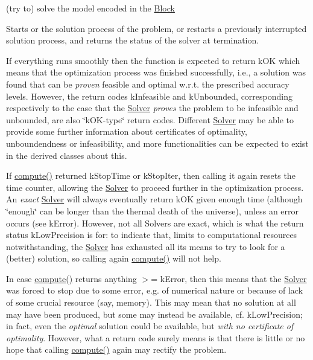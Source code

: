 (try to) solve the model encoded in the \mbox{\hyperlink{class_s_m_spp__di__unipi__it_1_1_block}{Block}} 

Starts or the solution process of the problem, or restarts a previously interrupted solution process, and returns the status of the solver at termination.

If everything runs smoothly then the function is expected to return k\+OK which means that the optimization process was finished successfully, i.\+e., a solution was found that can be {\itshape proven} feasible and optimal w.\+r.\+t. the prescribed accuracy levels. However, the return codes k\+Infeasible and k\+Unbounded, corresponding respectively to the case that the \mbox{\hyperlink{class_s_m_spp__di__unipi__it_1_1_solver}{Solver}} {\itshape proves} the problem to be infeasible and unbounded, are also \char`\"{}k\+O\+K-\/type\char`\"{} return codes. Different \mbox{\hyperlink{class_s_m_spp__di__unipi__it_1_1_solver}{Solver}} may be able to provide some further information about certificates of optimality, unboundendness or infeasibility, and more functionalities can be expected to exist in the derived classes about this.

If \mbox{\hyperlink{class_s_m_spp__di__unipi__it_1_1_solver_a504d4e3e174c7a518cc66156a8a45ce5}{compute()}} returned k\+Stop\+Time or k\+Stop\+Iter, then calling it again resets the time counter, allowing the \mbox{\hyperlink{class_s_m_spp__di__unipi__it_1_1_solver}{Solver}} to proceed further in the optimization process. An {\itshape exact} \mbox{\hyperlink{class_s_m_spp__di__unipi__it_1_1_solver}{Solver}} will always eventually return k\+OK given enough time (although \char`\"{}enough\char`\"{} can be longer than the thermal death of the universe), unless an error occurs (see k\+Error). However, not all Solvers are exact, which is what the return status k\+Low\+Precision is for\+: to indicate that, limits to computational resources notwithstanding, the \mbox{\hyperlink{class_s_m_spp__di__unipi__it_1_1_solver}{Solver}} has exhausted all its means to try to look for a (better) solution, so calling again \mbox{\hyperlink{class_s_m_spp__di__unipi__it_1_1_solver_a504d4e3e174c7a518cc66156a8a45ce5}{compute()}} will not help.

In case \mbox{\hyperlink{class_s_m_spp__di__unipi__it_1_1_solver_a504d4e3e174c7a518cc66156a8a45ce5}{compute()}} returns anything $>$= k\+Error, then this means that the \mbox{\hyperlink{class_s_m_spp__di__unipi__it_1_1_solver}{Solver}} was forced to stop due to some error, e.\+g. of numerical nature or because of lack of some crucial resource (say, memory). This may mean that no solution at all may have been produced, but some may instead be available, cf. k\+Low\+Precision; in fact, even the {\itshape optimal} solution could be available, but {\itshape with no certificate of optimality}. However, what a return code surely means is that there is little or no hope that calling \mbox{\hyperlink{class_s_m_spp__di__unipi__it_1_1_solver_a504d4e3e174c7a518cc66156a8a45ce5}{compute()}} again may rectify the problem.

